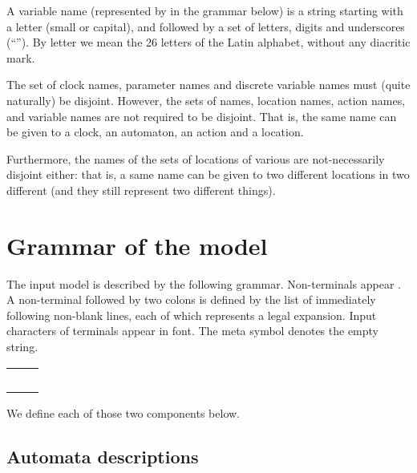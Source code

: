 A variable name (represented by  in the grammar below) is a string starting with a letter (small or capital), and followed by a set of letters, digits and underscores (``\styleIMI{\_}'').
By letter we mean the 26 letters of the Latin alphabet, without any diacritic mark.

The set of clock names, parameter names and discrete variable names must (quite naturally) be disjoint.
However, the sets of \IPTA{} names, location names, action names, and variable names are not required to be disjoint.
That is, the same name can be given to a clock, an automaton, an action and a location.

Furthermore, the names of the sets of locations of various \IPTA{} are not-necessarily disjoint either: that is, a same name can be given to two different locations in two different \IPTA{} (and they still represent two different things).


\section{Grammar of the model}\label{section:grammar:model}

The \imitator{} input model is described by the following grammar.
Non-terminals appear .
A non-terminal followed by two colons is defined by the list of immediately following non-blank lines, each of which represents a legal expansion.
Input characters of terminals appear in  font.
The meta symbol \emptystring{} denotes the empty string.



\begin{tabular}{l l}
	\  & \nt{automata\_descriptions} \nt{init} \\
\end{tabular}

\medskip


We define each of those two components below.

\subsection{Automata descriptions}

